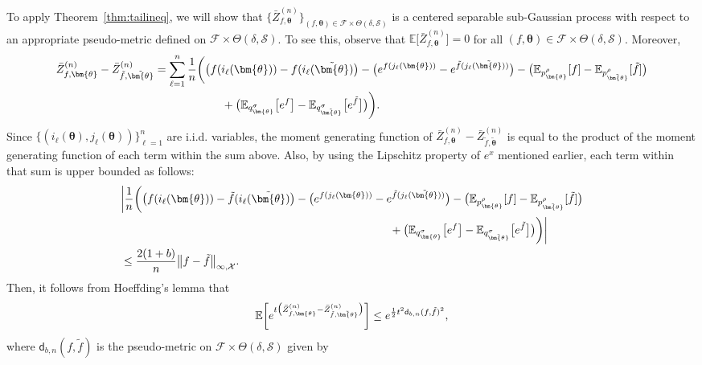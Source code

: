 \documentclass[a4paper,onecolumn,11pt,accepted=2026-05-12]{quantumarticle}
\newcommand{\cF}{\mathcal{F}}
\newcommand{\cS}{\mathcal{S}}
\newcommand{\cX}{\mathcal{X}}
\newcommand{\EE}{\mathbb{E}}
\begin{document}
To apply Theorem~\ref{thm:tailineq}, we will show that $\{\bar Z^{(n)}_{f,\bm{\theta}}\}_{(f,\bm{\theta})\in \cF \times \Theta(\delta,\cS)}$ is a centered  separable sub-Gaussian process with respect to an appropriate pseudo-metric defined on $ \cF \times \Theta(\delta,\cS)$. To see this, observe that $\EE\big[\bar Z^{(n)}_{f,\bm{\theta}}\big]=0$ for all $(f,\bm{\theta})\in \cF \times \Theta(\delta,\cS)$. Moreover,  
\begin{align}
\bar Z^{(n)}_{f,\bm{\theta}}-  \bar Z^{(n)}_{\tilde f,\tilde{\bm{\theta}}}  & = \sum_{\ell=1}^{n} \frac{1}{n} \bigg( \big(f(i_\ell(\bm{\theta}))-f(i_\ell(\tilde{\bm{\theta}})\big)-\big(
e^{f(j_\ell(\bm{\theta}))}-e^{\tilde f(j_\ell(\tilde{\bm{\theta}}))}\big)-\big(\EE_{p_{\bm{\theta}}^\rho}[f]-\EE_{p_{\tilde{\bm{\theta}}}^\rho}[\tilde f]\big) \notag \\
 &\qquad \qquad \qquad +\big(\EE_{q_{\bm{\theta}}^\sigma}\big[e^f\big]-\EE_{q_{\tilde{\bm{\theta}}}^\sigma}\big[e^{\tilde f}\big] \big) \bigg). \notag 
\end{align}
Since $\{(i_\ell(\bm{\theta}),j_\ell(\bm{\theta}))\}_{\ell=1}^n$ are i.i.d. variables, the moment generating function of $\bar Z^{(n)}_{f,\bm{\theta}}-  \bar Z^{(n)}_{\tilde f,\tilde{\bm{\theta}}}$ is equal to the product of the moment generating function of each term within the sum above. Also, by using the  Lipschitz property of $e^x$ mentioned earlier, each term within that sum is upper bounded as follows: 
\begin{align}
&\bigg|\frac{1}{n} \bigg( \big(f(i_\ell(\bm{\theta}))-\tilde f(i_\ell(\tilde{\bm{\theta}})\big)-\big(
e^{f(j_\ell(\bm{\theta}))}-e^{\tilde f(j_\ell(\tilde{\bm{\theta}}))}\big)-\big(\EE_{p_{\bm{\theta}}^\rho}[f]-\EE_{p_{\tilde{\bm{\theta}}}^\rho}[\tilde f]\big) \notag \\
&\qquad \qquad \qquad \qquad \qquad \qquad \qquad \qquad \qquad \qquad \qquad \qquad +\big(\EE_{q_{\bm{\theta}}^\sigma}\big[e^f\big]-\EE_{q_{\tilde{\bm{\theta}}}^\sigma}\big[e^{\tilde f}\big] \big) \bigg) \bigg| \notag \\
& \leq  \frac{2(1+b)}{n}\big\|f-\tilde f\big\|_{\infty,\cX}. \label{eq:bnddiffsep} 
\end{align} 
 Then, it follows from Hoeffding's lemma  that 
\begin{align}
\mathbb{E}\bigg[e^{t\big(\bar Z^{(n)}_{f,\bm{\theta}}-  \bar Z^{(n)}_{\tilde f,\tilde{\bm{\theta}}}\big)} \bigg]\leq   e^{\frac{1}{2}t^2 \mathsf{d}_{b,n}(f,\tilde f)^2}, \notag
\end{align}
where $\mathsf{d}_{b,n}(f,\tilde f)$ is the pseudo-metric on $\cF \times \Theta(\delta,\cS)$ given by
\end{document}
